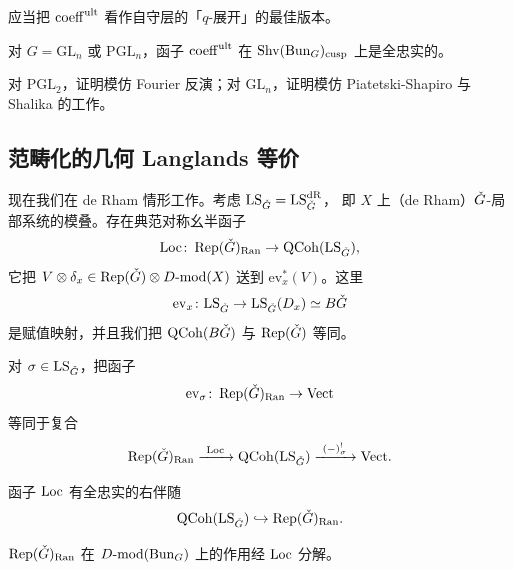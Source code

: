\begin{remark}\label{rem:q-expansion}
应当把 \(\operatorname{coeff}^{\mathrm{ult}}\) 看作自守层的「\(q\)-展开」的最佳版本。
\end{remark}

\begin{theorem}\label{thm:coeff-ff}
对 \(G=\mathrm{GL}_n\) 或 \(\mathrm{PGL}_n\)，函子 \(\operatorname{coeff}^{\mathrm{ult}}\) 在
\(\operatorname{Shv}(\operatorname{Bun}_G)_{\mathrm{cusp}}\) 上是全忠实的。
\end{theorem}

对 \(\mathrm{PGL}_2\)，证明模仿 Fourier 反演；对 \(\mathrm{GL}_n\)，证明模仿
Piatetski-Shapiro 与 Shalika 的工作。

\subsection{范畴化的几何 Langlands 等价}

现在我们在 de Rham 情形工作。考虑 \(\mathrm{LS}_{\check{G}}=\mathrm{LS}^{\mathrm{dR}}_{\check{G}}\)，
即 \(X\) 上（de Rham）\(\check{G}\)-局部系统的模叠。存在典范对称幺半函子
\[
\operatorname{Loc}\colon\operatorname{Rep}(\check{G})_{\mathrm{Ran}}\to\operatorname{QCoh}(\mathrm{LS}_{\check{G}}),
\]
它把 \(V\otimes\delta_x\in\operatorname{Rep}(\check{G})\otimes D\text{-}\mathrm{mod}(X)\) 送到 \(\mathrm{ev}_x^*(V)\)。这里
\[
\mathrm{ev}_x\colon\mathrm{LS}_{\check{G}}\to\mathrm{LS}_{\check{G}}(D_x)\simeq B\check{G}
\]
是赋值映射，并且我们把 \(\operatorname{QCoh}(B\check{G})\) 与 \(\operatorname{Rep}(\check{G})\) 等同。

\begin{exercise}\label{ex:ev-loc}
对 \(\sigma\in\mathrm{LS}_{\check{G}}\)，把函子
\[
\mathrm{ev}_\sigma\colon\operatorname{Rep}(\check{G})_{\mathrm{Ran}}\to\mathrm{Vect}
\]
等同于复合
\[
\Rep(\Gd)_{\mathrm{Ran}}\xrightarrow{\ \Loc\ }\QCoh(\mathrm{LS}_{\Gd})
\xrightarrow{\ (-)^!_\sigma\ }\Vect.
\]
\end{exercise}

\begin{theorem}\label{thm:loc-adjoint}
函子 \(\operatorname{Loc}\) 有全忠实的右伴随
\[
\operatorname{QCoh}(\mathrm{LS}_{\check{G}})\hookrightarrow\operatorname{Rep}(\check{G})_{\mathrm{Ran}}.
\]
\end{theorem}

\begin{theorem}\label{thm:action-factors}
\(\operatorname{Rep}(\check{G})_{\mathrm{Ran}}\) 在 \(D\text{-}\mathrm{mod}(\operatorname{Bun}_G)\) 上的作用经 \(\operatorname{Loc}\) 分解。
\end{theorem}

